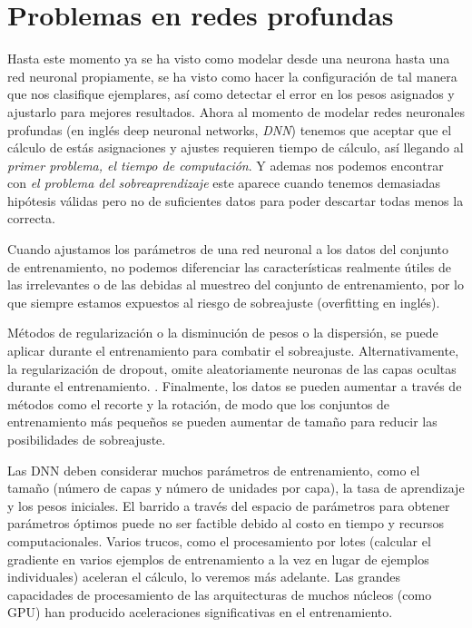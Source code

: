 \section{Problemas en redes profundas}

Hasta este momento ya se ha visto como modelar desde una neurona hasta una red neuronal propiamente, se ha visto como hacer la configuración de tal manera que nos clasifique ejemplares, así como detectar el error en los pesos asignados y ajustarlo para mejores resultados. Ahora al momento de modelar redes neuronales profundas (en inglés deep neuronal networks, \emph{DNN}) tenemos que aceptar que el cálculo de estás asignaciones y ajustes requieren tiempo de cálculo, así llegando al \emph{primer problema, el tiempo de computación}. Y ademas nos podemos encontrar con \emph{el problema del sobreaprendizaje} este aparece cuando tenemos demasiadas hipótesis válidas pero no de suficientes datos para poder descartar todas menos la correcta. 

Cuando ajustamos los parámetros de una red neuronal a los datos del conjunto de entrenamiento, no podemos diferenciar las características realmente útiles de las irrelevantes o de las debidas al muestreo del conjunto de entrenamiento, por lo que siempre estamos
expuestos al riesgo de sobreajuste (overfitting en inglés).


 Métodos de regularización o la disminución de pesos  o la dispersión, se puede aplicar durante el entrenamiento para combatir el sobreajuste. Alternativamente, la regularización de dropout, omite aleatoriamente neuronas de las capas ocultas durante el entrenamiento. . Finalmente, los datos se pueden aumentar a través de métodos como el recorte y la rotación, de modo que los conjuntos de entrenamiento más pequeños se pueden aumentar de tamaño para reducir las posibilidades de sobreajuste.

Las DNN deben considerar muchos parámetros de entrenamiento, como el tamaño (número de capas y número de unidades por capa), la tasa de aprendizaje y los pesos iniciales. El barrido a través del espacio de parámetros para obtener parámetros óptimos puede no ser factible debido al costo en tiempo y recursos computacionales. Varios trucos, como el procesamiento por lotes (calcular el gradiente en varios ejemplos de entrenamiento a la vez en lugar de ejemplos individuales)  aceleran el cálculo, lo veremos más adelante. Las grandes capacidades de procesamiento de las arquitecturas de muchos núcleos (como GPU) han producido aceleraciones significativas en el entrenamiento.

